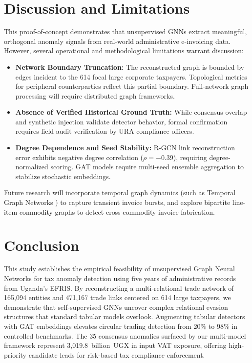 \documentclass[10pt,twocolumn]{article}
\begin{document}
\section{Discussion and Limitations}
\label{sec:discussion}

This proof-of-concept demonstrates that unsupervised GNNs extract meaningful, orthogonal anomaly signals from real-world administrative e-invoicing data. However, several operational and methodological limitations warrant discussion:
\begin{itemize}
  \item \textbf{Network Boundary Truncation:} The reconstructed graph is bounded by edges incident to the 614 focal large corporate taxpayers. Topological metrics for peripheral counterparties reflect this partial boundary. Full-network graph processing will require distributed graph frameworks.
  \item \textbf{Absence of Verified Historical Ground Truth:} While consensus overlap and synthetic injection validate detector behavior, formal confirmation requires field audit verification by URA compliance officers.
  \item \textbf{Degree Dependence and Seed Stability:} R-GCN link reconstruction error exhibits negative degree correlation ($\rho = -0.39$), requiring degree-normalized scoring. GAT models require multi-seed ensemble aggregation to stabilize stochastic embeddings.
\end{itemize}

Future research will incorporate temporal graph dynamics (such as Temporal Graph Networks \cite{rossi2020temporal}) to capture transient invoice bursts, and explore bipartite line-item commodity graphs to detect cross-commodity invoice fabrication.

\section{Conclusion}
\label{sec:conclusion}

This study establishes the empirical feasibility of unsupervised Graph Neural Networks for tax anomaly detection using five years of administrative records from Uganda's EFRIS. By reconstructing a multi-relational trade network of 165,094 entities and 471,167 trade links centered on 614 large taxpayers, we demonstrate that self-supervised GNNs uncover complex relational evasion structures that standard tabular models overlook. Augmenting tabular detectors with GAT embeddings elevates circular trading detection from 20\% to 98\% in controlled benchmarks. The 35 consensus anomalies surfaced by our multi-model framework represent 3,019.8~billion~UGX in input VAT exposure, offering high-priority candidate leads for risk-based tax compliance enforcement.

\small

\end{document}
